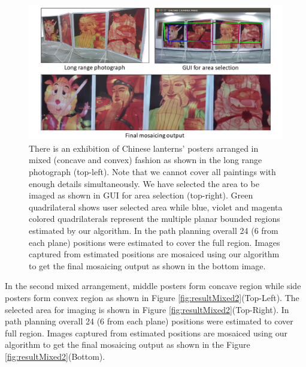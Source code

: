 \begin{figure}[t!]
\centering
\includegraphics[width=\linewidth]{figures/multiplanar/mixed1Result.pdf}
\caption[Result: Mixed arrangement]{There is an exhibition of Chinese lanterns'
posters arranged in mixed (concave and convex) fashion as shown in the long range photograph
(top-left). Note that we cannot cover all paintings with enough details
simultaneously. We have selected the area to be imaged as shown in GUI for
area selection (top-right). Green quadrilateral shows user selected area while
blue, violet and magenta colored quadrilaterals represent the multiple
planar bounded regions estimated by our algorithm. In the path planning overall
24 (6 from each plane) positions were estimated to cover the full region. Images
captured from estimated positions are mosaiced using our algorithm to get the
final mosaicing output as shown in the bottom image.}
\label{fig:resultMixed1}
\end{figure}

In the second mixed arrangement, middle posters form concave region while
 side posters form convex region as shown in Figure
\ref{fig:resultMixed2}(Top-Left). The selected area for imaging is shown in
Figure \ref{fig:resultMixed2}(Top-Right).  In path planning overall 24 (6 from
each plane) positions were estimated to cover full region. Images captured from
estimated positions are mosaiced using our algorithm to get the final mosaicing
output as shown in the Figure \ref{fig:resultMixed2}(Bottom).

